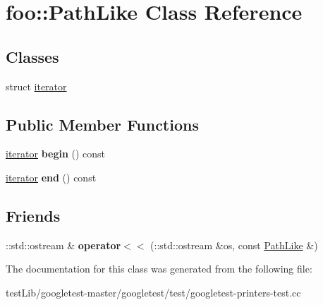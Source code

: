 \hypertarget{classfoo_1_1PathLike}{}\section{foo\+:\+:Path\+Like Class Reference}
\label{classfoo_1_1PathLike}
\subsection*{Classes}
\begin{DoxyCompactItemize}
\item 
struct \hyperlink{structfoo_1_1PathLike_1_1iterator}{iterator}
\end{DoxyCompactItemize}
\subsection*{Public Member Functions}
\begin{DoxyCompactItemize}
\item 
\mbox{\label{classfoo_1_1PathLike_a7ca8b63139fd6fcada55fbf13ccf9c83}} 
\hyperlink{structfoo_1_1PathLike_1_1iterator}{iterator} {\bfseries begin} () const
\item 
\mbox{\label{classfoo_1_1PathLike_aca85cd005890f1d19f416ca7e2c95f02}} 
\hyperlink{structfoo_1_1PathLike_1_1iterator}{iterator} {\bfseries end} () const
\end{DoxyCompactItemize}
\subsection*{Friends}
\begin{DoxyCompactItemize}
\item 
\mbox{\label{classfoo_1_1PathLike_ab5544a5497a8a470802bd8fcf97c49da}} 
\+::std\+::ostream \& {\bfseries operator$<$$<$} (\+::std\+::ostream \&os, const \hyperlink{classfoo_1_1PathLike}{Path\+Like} \&)
\end{DoxyCompactItemize}


The documentation for this class was generated from the following file\+:\begin{DoxyCompactItemize}
\item 
test\+Lib/googletest-\/master/googletest/test/googletest-\/printers-\/test.\+cc\end{DoxyCompactItemize}
